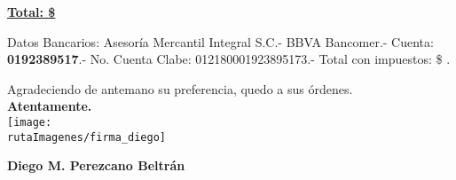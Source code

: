 \begin{flushright}
	\textbf{\underline{\textcolor{principal}{Total: \$\numprint[MXN]{\total}}}}
\end{flushright}

\textcolor{secundario}{Datos Bancarios:} Asesor\'ia Mercantil Integral S.C.- BBVA Bancomer.- Cuenta:  \textbf{\textcolor{secundario}{0192389517}}.- No. Cuenta Clabe: 012180001923895173.- Total con impuestos: \textcolor{secundario}{\$\numprint[MXN]{\total} .}


\begin{center}
Agradeciendo de antemano su preferencia, quedo a sus \'ordenes.\\
\textbf{Atentamente.}\\
\texttt{[image: \\rutaImagenes/firma\_diego]}

\textbf{Diego M. Perezcano Beltr\'an}

\end{center}

